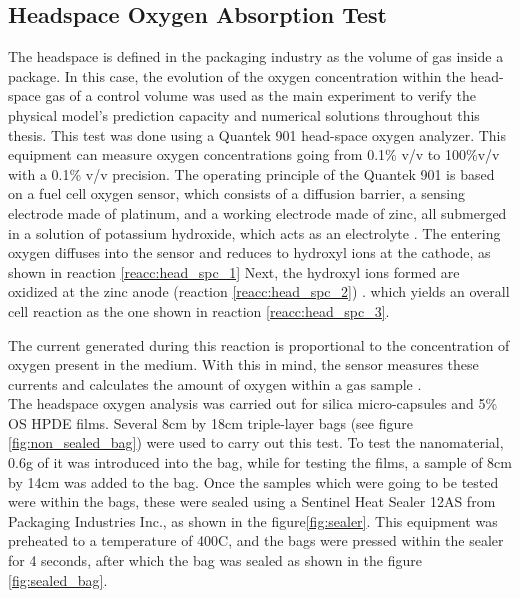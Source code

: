 \begin{refsection}
\subsection{Headspace Oxygen Absorption Test}\label{sec:headspace}
The headspace is defined in the packaging industry as the volume of gas inside a package. In this case, the evolution of the oxygen concentration within the head-space gas of a control volume was used as the main experiment to verify the physical model's prediction capacity and numerical solutions throughout this thesis.  This test was done using a Quantek 901 head-space oxygen analyzer. This equipment can measure oxygen concentrations going from 0.1\% v/v to 100\%v/v with a 0.1\% v/v precision. The operating principle of the Quantek 901 is based on a fuel cell oxygen sensor, which consists of a diffusion barrier, a sensing electrode made of platinum, and a working electrode made of zinc, all submerged in a solution of potassium hydroxide, which acts as an electrolyte \cite{Boissevain1996CorporateGuide}. The entering oxygen diffuses into the sensor and reduces to hydroxyl ions at the cathode, as shown in reaction \ref{reacc:head_spc_1}  Next, the hydroxyl ions formed are oxidized at the zinc anode (reaction \ref{reacc:head_spc_2}) .
 which yields an overall cell reaction as the one shown in reaction \ref{reacc:head_spc_3}.

 
 The current generated during this reaction is proportional to the concentration of oxygen present in the medium. With this in mind,  the sensor measures these currents and calculates the amount of oxygen within a gas sample \cite{GarciaMora2015KineticScavengers, Boissevain1996CorporateGuide}.\\
 
 The headspace oxygen analysis was carried out for silica micro-capsules and 5\% OS HPDE films. Several 8cm by 18cm triple-layer bags (see figure \ref{fig:non_sealed_bag}) were used to carry out this test. To test the nanomaterial, 0.6g of it was introduced into the bag, while for testing the films, a sample of 8cm by 14cm was added to the bag. Once the samples which were going to be tested were within the bags, these were sealed using a Sentinel Heat Sealer 12AS from Packaging Industries Inc., as shown in the figure\ref{fig:sealer}. This equipment was preheated to a temperature of 400\degree C, and the bags were pressed within the sealer for 4 seconds, after which the bag was sealed as shown in the figure \ref{fig:sealed_bag}.  
 

\end{refsection}
